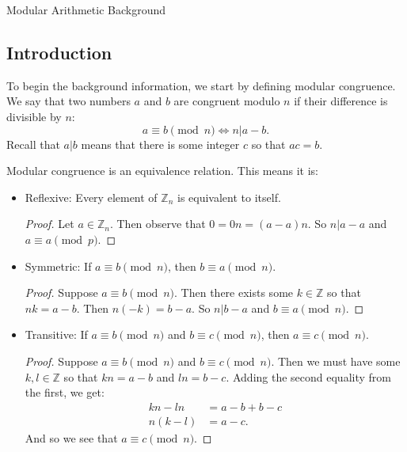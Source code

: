 \documentclass{article}
\begin{document}
    \huge Modular Arithmetic Background
    \normalsize
\begin{enumerate} 

    \section{Introduction}

    To begin the background information, we start by defining modular congruence. We say that two numbers $a$ and $b$ are congruent modulo $n$ if their difference is divisible by $n$:
    \[
    a\equiv b\pmod{n}\iff n|a-b
    .\] 
    Recall that $a|b$ means that there is some integer $c$ so that $ac=b$.

    Modular congruence is an equivalence relation. This means it is:
    \begin{itemize}
        \item Reflexive: Every element of $\mathbb{Z}_n$ is equivalent to itself.
            \begin{proof} 
                Let $a\in \mathbb{Z}_n$. Then observe that $0=0n=(a-a)n$. So $n|a-a$ and $a\equiv a\pmod{p}$.
            \end{proof}
        \item Symmetric: If $a\equiv b\pmod{n}$, then $b\equiv a \pmod{n}$.
            \begin{proof} 
                Suppose $a\equiv b\pmod{n}$. Then there exists some $k\in \mathbb{Z}$
                so that $nk=a-b$. Then $n(-k)=b-a$. So $n|b-a$ and $b\equiv a\pmod{n}$.
            \end{proof}
        \item Transitive: If $a\equiv b\pmod{n}$ and $b\equiv c\pmod{n}$, then $a\equiv c \pmod{n}$.
            \begin{proof} 
                Suppose $a\equiv b\pmod{n}$ and $b\equiv c\pmod{n}$. Then we must have
                some $k,l\in \mathbb{Z}$ so that $kn=a-b$ and $ln=b-c$. Adding
                the second equality from the first, we get:
                \begin{align*}
                    kn- l n&= a-b+b-c \\
                    n(k- l) &= a-c 
                .\end{align*}
                And so we see that $a\equiv c\pmod{n}$.
            \end{proof}
    \end{itemize}

\end{enumerate}
\end{document}
